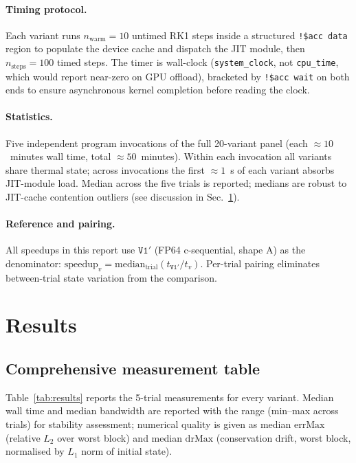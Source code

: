 \documentclass[11pt,a4paper]{article}
\begin{document}
\paragraph{Timing protocol.}  Each variant runs \(n_{\mathrm{warm}} =
10\) untimed RK1 steps inside a structured \texttt{!\$acc data} region
to populate the device cache and dispatch the JIT module, then
\(n_{\mathrm{steps}} = 100\) timed steps. The timer is wall-clock
(\texttt{system\_clock}, not \texttt{cpu\_time}, which would report
near-zero on GPU offload), bracketed by \texttt{!\$acc wait} on both
ends to ensure asynchronous kernel completion before reading the
clock.

\paragraph{Statistics.}  Five independent program invocations of the
full 20-variant panel (each \(\approx 10\)~minutes wall time, total
\(\approx 50\)~minutes). Within each invocation all variants share
thermal state; across invocations the first \(\approx 1\)~s of each
variant absorbs JIT-module load. Median across the five trials is
reported; medians are robust to JIT-cache contention outliers (see
discussion in Sec.~\ref{sec:results}).

\paragraph{Reference and pairing.}  All speedups in this report use
\(\mathtt{V1'}\) (FP64 c-sequential, shape A) as the denominator:
\(\mathrm{speedup}_v = \mathrm{median}_{\text{trial}}
(t_{\mathtt{V1'}}/t_v)\).  Per-trial pairing eliminates between-trial
state variation from the comparison.

\section{Results}
\label{sec:results}

\subsection{Comprehensive measurement table}

Table~\ref{tab:results} reports the 5-trial measurements for every
variant. Median wall time and median bandwidth are reported with the
range (min--max across trials) for stability assessment; numerical
quality is given as median \(\mathrm{errMax}\) (relative \(L_2\) over
worst block) and median \(\mathrm{drMax}\) (conservation drift,
worst block, normalised by \(L_1\) norm of initial state).
\end{document}
